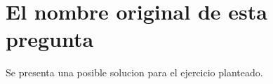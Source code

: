 \section{El nombre original de esta pregunta}

    Se presenta una posible solucion para el ejercicio planteado.
    

